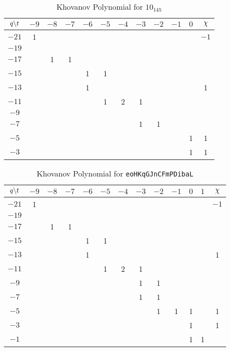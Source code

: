 \documentclass{article}
\theoremstyle{plain}
\begin{document}
        \begin{table}
            \centering
            \begin{tabular}{| c | c | c | c | c | c | c | c | c | c | c | c |}
                \hline
                $q\symbol{92}t$&$-9$&$-8$&$-7$&$-6$&$-5$&$-4$&$-3$&$-2$&$-1$&$0$&$\chi$\\
                \hline
                $-21$&1&&&&&&&&&&$-1$\\
                \hline
                $-19$&&&&&&&&&&&\\
                \hline
                $-17$&&1&1&&&&&&&&\\
                \hline
                $-15$&&&&1&1&&&&&&\\
                \hline
                $-13$&&&&1&&&&&&&1\\
                \hline
                $-11$&&&&&1&2&1&&&&\\
                \hline
                $-9$&&&&&&&&&&&\\
                \hline
                $-7$&&&&&&&1&1&&&\\
                \hline
                $-5$&&&&&&&&&&1&1\\
                \hline
                $-3$&&&&&&&&&&1&1\\
                \hline
            \end{tabular}
            \caption{Khovanov Polynomial for $10_{145}$}
        \end{table}
        \begin{table}
            \centering
            \begin{tabular}{| c | c | c | c | c | c | c | c | c | c | c | c | c |}
                \hline
                $q\symbol{92}t$&$-9$&$-8$&$-7$&$-6$&$-5$&$-4$&$-3$&$-2$&$-1$&$0$&$1$&$\chi$\\
                \hline
                $-21$&1&&&&&&&&&&&$-1$\\
                \hline
                $-19$&&&&&&&&&&&&\\
                \hline
                $-17$&&1&1&&&&&&&&&\\
                \hline
                $-15$&&&&1&1&&&&&&&\\
                \hline
                $-13$&&&&1&&&&&&&&1\\
                \hline
                $-11$&&&&&1&2&1&&&&&\\
                \hline
                $-9$&&&&&&&1&1&&&&\\
                \hline
                $-7$&&&&&&&1&1&&&&\\
                \hline
                $-5$&&&&&&&&1&1&1&&1\\
                \hline
                $-3$&&&&&&&&&&1&&1\\
                \hline
                $-1$&&&&&&&&&&1&1&\\
                \hline
            \end{tabular}
            \caption{Khovanov Polynomial for \texttt{eoHKqGJnCFmPDibaL}}
        \end{table}
\end{document}

